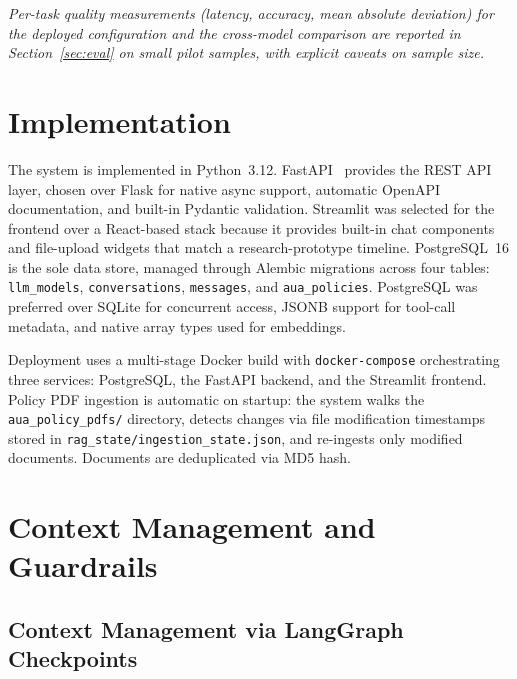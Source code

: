 \documentclass[conference]{IEEEtran}
\begin{document}
\textit{Per-task quality measurements (latency, accuracy, mean absolute deviation) for the deployed configuration and the cross-model comparison are reported in Section~\ref{sec:eval} on small pilot samples, with explicit caveats on sample size.}

\section{Implementation}

The system is implemented in Python~3.12. FastAPI~\cite{fastapi2024} provides the REST API layer, chosen over Flask for native async support, automatic OpenAPI documentation, and built-in Pydantic validation. Streamlit was selected for the frontend over a React-based stack because it provides built-in chat components and file-upload widgets that match a research-prototype timeline. PostgreSQL~16 is the sole data store, managed through Alembic migrations across four tables: \texttt{llm\_models}, \texttt{conversations}, \texttt{messages}, and \texttt{aua\_policies}. PostgreSQL was preferred over SQLite for concurrent access, JSONB support for tool-call metadata, and native array types used for embeddings.

Deployment uses a multi-stage Docker build with \texttt{docker-compose} orchestrating three services: PostgreSQL, the FastAPI backend, and the Streamlit frontend. Policy PDF ingestion is automatic on startup: the system walks the \texttt{aua\_policy\_pdfs/} directory, detects changes via file modification timestamps stored in \texttt{rag\_state/ingestion\_state.json}, and re-ingests only modified documents. Documents are deduplicated via MD5 hash.

\section{Context Management and Guardrails}

\subsection{Context Management via LangGraph Checkpoints}
\label{sec:context}
\end{document}
